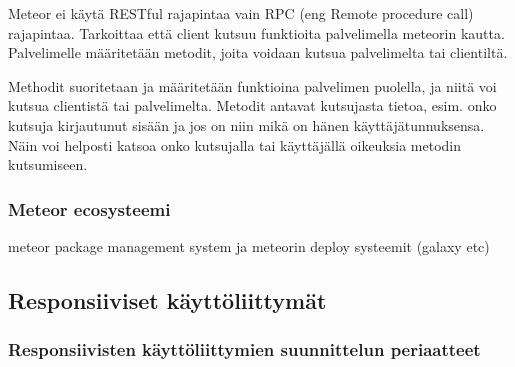 \documentclass[11pt,a4paper,titlepage,oneside]{article}
\begin{document}




Meteor ei käytä RESTful rajapintaa vain RPC (eng Remote procedure call) rajapintaa. 
Tarkoittaa että client kutsuu funktioita palvelimella meteorin kautta.
Palvelimelle määritetään metodit, joita voidaan kutsua palvelimelta tai clientiltä.
\medskip


Methodit suoritetaan ja määritetään funktioina palvelimen puolella, ja niitä voi kutsua clientistä tai palvelimelta.
Metodit antavat kutsujasta tietoa, esim. onko kutsuja kirjautunut sisään ja jos on niin mikä on hänen käyttäjätunnuksensa. 
Näin voi helposti katsoa onko kutsujalla tai käyttäjällä oikeuksia metodin kutsumiseen.
\medskip




\subsubsection{Meteor ecosysteemi}
meteor package management system ja meteorin deploy systeemit (galaxy etc)








\newpage
{}%






\newpage
{}        %











\newpage
\subsection{Responsiiviset käyttöliittymät}

\subsubsection{Responsiivisten käyttöliittymien suunnittelun periaatteet}
\end{document}
